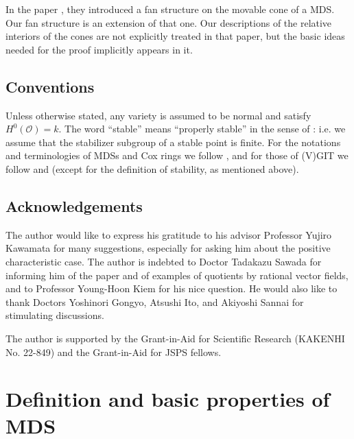 \documentclass[12pt,twoside]{amsart}
\theoremstyle{definition}
\newcommand\OO{\mathcal{O}}
\begin{document}
In the paper \cite{hk}, they introduced a fan structure on the movable cone of a MDS. Our fan structure is
an extension of that one. Our descriptions of the relative interiors of the cones are not explicitly
treated in that paper, but the basic ideas needed for the proof implicitly appears in it. 








\subsection*{Conventions}
Unless otherwise stated, any variety is assumed to be normal and satisfy $H^0(\OO)=k$.
The word ``stable'' means ``properly stable'' in the sense of \cite{git}: i.e.
we assume that the stabilizer subgroup of a stable point is finite.
For the notations and terminologies of MDSs and Cox rings we follow \cite{hk}, and
for those of (V)GIT we follow \cite{dh} and \cite{git} (except for the definition of stability, as
mentioned above).



\subsection*{Acknowledgements}
The author would like to express his gratitude to his advisor Professor Yujiro Kawamata
for many suggestions, especially for asking him about the positive characteristic case.
The author is indebted to Doctor Tadakazu Sawada for informing him of the paper
\cite{rs} and of examples of quotients by rational vector fields, and
to Professor Young-Hoon Kiem for his nice question.
He would also like to thank Doctors Yoshinori Gongyo, Atsushi Ito, and Akiyoshi Sannai for
stimulating discussions.

The author is supported by the Grant-in-Aid for Scientific Research
(KAKENHI No. 22-849) and the Grant-in-Aid for JSPS fellows.




\newpage

\section{Definition and basic properties of MDS}
\label{Definition and basic properties of MDS}
\end{document}
